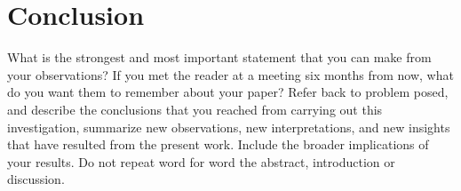 \chapter{Conclusion}
\label{chapterlabel6}


    What is the strongest and most important statement that you can make from your observations? 
    If you met the reader at a meeting six months from now, what do you want them to remember about your paper? 
    Refer back to problem posed, and describe the conclusions that you reached from carrying out this investigation, summarize new observations, new interpretations, and new insights that have resulted from the present work.
    Include the broader implications of your results. 
    Do not repeat word for word the abstract, introduction or discussion.

